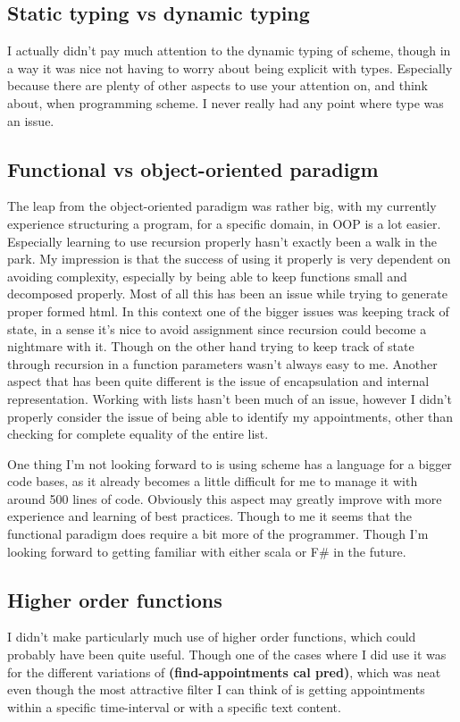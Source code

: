 \documentclass{IOS-Book-Article}
\begin{document}
\subsection*{Static typing vs dynamic typing}
I actually didn't pay much attention to the dynamic typing of scheme, though in a way it was nice not having to worry about  being explicit with types. Especially because there are plenty of other aspects to use your attention on, and think about, when programming scheme. I never really had any point where type was an issue.

\subsection*{Functional vs object-oriented paradigm}
The leap from the object-oriented paradigm was rather big, with my currently experience structuring a program, for a specific domain, in OOP is a lot easier. Especially learning to use recursion properly hasn't exactly been a walk in the park. My impression is that the success of using it properly is very dependent on avoiding complexity, especially by being able to keep functions small and decomposed properly. Most of all this has been an issue while trying to generate proper formed html. In this context one of the bigger issues was keeping track of state, in a sense it's nice to avoid assignment since recursion could become a nightmare with it. Though on the other hand trying to keep track of state through recursion in a function parameters wasn't always easy to me. 
Another aspect that has been quite different is the issue of encapsulation and internal representation. Working with lists hasn't been much of an issue, however I didn't properly consider the issue of being able to identify my appointments, other than checking for complete equality of the entire list.

One thing I'm not looking forward to is using scheme has a language for a bigger code bases, as it already becomes a little difficult for me to manage it with around 500 lines of code. Obviously this aspect may greatly improve with more experience and learning of best practices. Though to me it seems that the functional paradigm does require a bit more of the programmer. Though I'm looking forward to getting familiar with either scala or F\# in the future.

\subsection*{Higher order functions}
I didn't make particularly much use of higher order functions, which could probably have been quite useful. Though one of the cases where I did use it was for the different variations of \textbf{(find-appointments cal pred)}, which was neat even though the most attractive filter I can think of is getting appointments within a specific time-interval or with a specific text content.   
\end{document}
